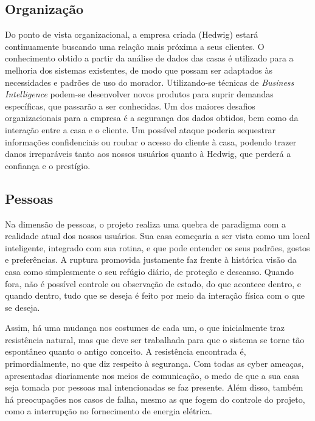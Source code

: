 
\subsection{Organização}

Do ponto de vista organizacional, a empresa criada (Hedwig) estará continuamente buscando uma relação mais próxima a seus clientes. O conhecimento obtido a partir da análise de dados das casas é utilizado para a melhoria dos sistemas existentes, de modo que possam ser adaptados às necessidades e padrões de uso do morador. Utilizando-se técnicas de \emph{Business Intelligence} podem-se desenvolver novos produtos para suprir demandas específicas, que passarão a ser conhecidas. Um dos maiores desafios organizacionais para a empresa é a segurança dos dados obtidos, bem como da interação entre a casa e o cliente. Um possível ataque poderia sequestrar informações confidenciais ou roubar o acesso do cliente à casa, podendo trazer danos irreparáveis tanto aos nossos usuários quanto à Hedwig, que perderá a confiança e o prestígio.

\subsection{Pessoas}

Na dimensão de pessoas, o projeto realiza uma quebra de paradigma com a realidade atual dos nossos usuários. Sua casa começaria a ser vista como um local inteligente, integrado com sua rotina, e que pode entender os seus padrões, gostos e preferências. A ruptura promovida justamente faz frente à histórica visão da casa como simplesmente o seu refúgio diário, de proteção e descanso. Quando fora, não é possível controle ou observação de estado, do que acontece dentro, e quando dentro, tudo que se deseja é feito por meio da interação física com o que se deseja.

Assim, há uma mudança nos costumes de cada um, o que inicialmente traz resistência natural, mas que deve ser trabalhada para que o sistema se torne tão espontâneo quanto o antigo conceito. A resistência encontrada é, primordialmente, no que diz respeito à segurança. Com todas as cyber ameaças, apresentadas diariamente nos meios de comunicação, o medo de que a sua casa seja tomada por pessoas mal intencionadas se faz presente. Além disso, também há preocupações nos casos de falha, mesmo as que fogem do controle do projeto, como a interrupção no fornecimento de energia elétrica.

